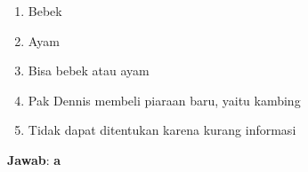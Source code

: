 \documentclass{article}
\theoremstyle{plain}
\begin{document}
	\begin{enumerate}[-,topsep=0pt, nosep,label=\alph*. ]
		\item Bebek
		\item Ayam
		\item Bisa bebek atau ayam
		\item Pak Dennis membeli piaraan baru, yaitu kambing
		\item Tidak dapat ditentukan karena kurang informasi
	\end{enumerate}

\bigskip
\noindent \textbf{Jawab}: \textbf{a}











\end{document}
